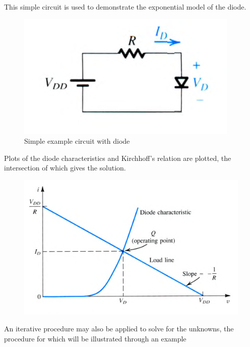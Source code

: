 \documentclass[../notes.tex]{subfiles}
\begin{document}
\begin{example}

	This simple circuit is used to demonstrate the exponential model of the diode.
	\begin{figure}[H]
		\centering
		\includegraphics[width=0.8\linewidth]{img/image_2022-09-16-22-33-11.png}
		\caption{Simple example circuit with diode}
		\label{fig:360:forward_conducting_diode_example}
	\end{figure}
	
	Plots of the diode characteristics and Kirchhoff's relation are plotted, the intersection of which gives the solution.

	\begin{figure}[H]
		\centering
		\includegraphics[width=0.8\linewidth]{img/image_2022-09-16-22-32-51.png}
	\end{figure}
\end{example}

An iterative procedure may also be applied to solve for the unknowns, the procedure for which will be illustrated through an example
\end{document}
